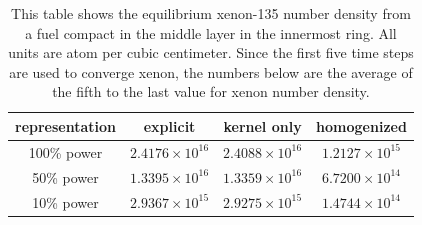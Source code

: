 \documentclass[letterpaper]{physor2024}
\begin{document}
\begin{table}[!h]
    \centering
    \caption{This table shows the equilibrium xenon-135 number density from a fuel compact in the middle layer in the innermost ring. All units are atom per cubic centimeter. Since the first five time steps are used to converge xenon, the numbers below are the average of the fifth to the last value for xenon number density.}
    \begin{tabular}{c|c|c|c|}
     representation & explicit & kernel only & homogenized \\ \hline
    100\% power & $2.4176\times 10^{16}$ & $2.4088\times 10^{16}$ & $1.2127\times 10^{15}$ \\  \hline
    50\% power & $1.3395\times 10^{16}$ & $1.3359\times 10^{16}$ & $6.7200\times 10^{14}$ \\ \hline
    10\% power & $2.9367\times 10^{15}$ & $2.9275\times 10^{15}$ & $1.4744\times 10^{14}$ \\ \hline
    \end{tabular}
    \label{tab:xenons}
\end{table}
\end{document}
